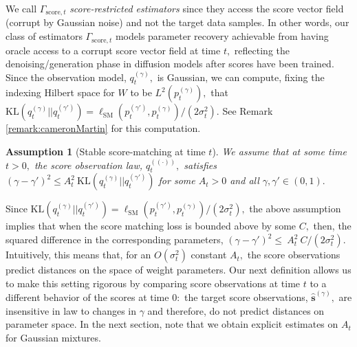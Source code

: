 \documentclass[11pt]{article}
\newcommand{\becca}[1]{\textcolor{dkred}{[becca: #1]}}
\theoremstyle{plain}
\newtheorem{assumption}[theorem]{Assumption}
\newcommand{\1}{\mathbbm{1}}
\newcommand{\lsm}{\ell_\mathrm{SM}}
\newcommand{\pdist}[2][]{p_{#1}^{(#2)}}
\newcommand{\qdist}[2][]{q_{#1}^{(#2)}}
\begin{document}
We call $\Gamma_{\mathrm{score},t}$ \emph{score-restricted estimators} since they access the score vector field (corrupt by Gaussian noise) and not the target data samples. In other words, our class of estimators $\Gamma_{\mathrm{score},t}$ models parameter recovery achievable from having oracle access to a corrupt score vector field at time $t,$ reflecting the denoising/generation phase in diffusion models after scores have been trained. 
Since the observation model, $\qdist[t]{\gamma},$ is Gaussian, we can compute, fixing the indexing Hilbert space for $W$ to be $L^2(\pdist[t]{\gamma}),$ that $\mathrm{KL}(\qdist[t]{\gamma}||\qdist[t]{\gamma'}) = \lsm(\pdist[t]{\gamma'}, \pdist[t]{\gamma})/(2\sigma_t^2).$ See Remark \ref{remark:cameronMartin} for this computation. 

\begin{assumption}[Stable score-matching at time $t$] We assume that at some time $t > 0,$ the score observation law, $\qdist[t]{(\cdot)},$ satisfies $ (\gamma - \gamma')^2 \leq A_t^2 \: \mathrm{KL}(\qdist[t]{\gamma}||\qdist[t]{\gamma'})$ for some $A_t >0$ and  all $\gamma, \gamma' \in (0,1).$  
\label{assumption:continuity}
\end{assumption}

Since $\mathrm{KL}(\qdist[t]{\gamma}||\qdist[t]{\gamma'}) = \lsm(\pdist[t]{\gamma'}, \pdist[t]{\gamma})/(2\sigma_t^2),$ the above assumption implies that when the score matching loss is bounded above by some $C,$ then, the squared difference in the corresponding parameters, $(\gamma - \gamma')^2 \leq  \:A_t^2\: C / (2\sigma_t^2).$ 
Intuitively, this means that, for an 
$O(\sigma_t^2)$
constant $A_t,$ the score observations predict distances on the space of weight parameters.    Our next definition allows us to make this setting rigorous by comparing score observations at  time $t$ to a different behavior of the scores at time $0:$ the target score observations, $\hat{\mathbf s}^{(\gamma)},$ are insensitive in law to changes in $\gamma$ and therefore, do not predict distances on parameter space. In the next section, note that we obtain explicit estimates on $A_t$ for Gaussian mixtures. 
\end{document}
